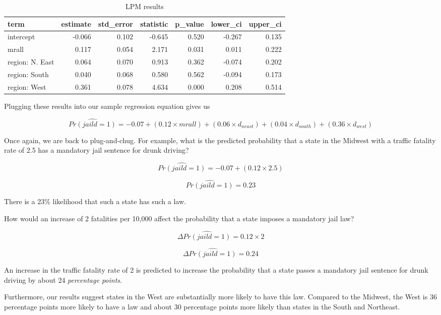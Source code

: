 \documentclass[
]{book}
\begin{document}
\begin{table}

\caption{\label{tab:lpmresults}LPM results}
\centering
\begin{tabular}[t]{l|r|r|r|r|r|r}
\hline
term & estimate & std\_error & statistic & p\_value & lower\_ci & upper\_ci\\
\hline
intercept & -0.066 & 0.102 & -0.645 & 0.520 & -0.267 & 0.135\\
\hline
mrall & 0.117 & 0.054 & 2.171 & 0.031 & 0.011 & 0.222\\
\hline
region: N. East & 0.064 & 0.070 & 0.913 & 0.362 & -0.074 & 0.202\\
\hline
region: South & 0.040 & 0.068 & 0.580 & 0.562 & -0.094 & 0.173\\
\hline
region: West & 0.361 & 0.078 & 4.634 & 0.000 & 0.208 & 0.514\\
\hline
\end{tabular}
\end{table}

Plugging these results into our sample regression equation gives us

\[\hat{Pr(jaild=1)}= -0.07 + (0.12 \times mrall) + (0.06 \times d_{neast}) + (0.04 \times d_{south}) + (0.36 \times d_{west})\]

Once again, we are back to plug-and-chug. For example, what is the predicted probability that a state in the Midwest with a traffic fatality rate of 2.5 has a mandatory jail sentence for drunk driving?

\[\hat{Pr(jaild=1)}= -0.07 + (0.12 \times 2.5)\]

\[\hat{Pr(jaild=1)}=0.23\]

There is a 23\% likelihood that such a state has such a law.

How would an increase of 2 fatalities per 10,000 affect the probability that a state imposes a mandatory jail law?

\[\Delta \hat{Pr(jaild=1)}=0.12 \times 2\]

\[\Delta \hat{Pr(jaild=1)}=0.24\]

An increase in the traffic fatality rate of 2 is predicted to increase the probability that a state passes a mandatory jail sentence for drunk driving by about 24 \emph{percentage points}.

Furthermore, our results suggest states in the West are substantially more likely to have this law. Compared to the Midwest, the West is 36 percentage points more likely to have a law and about 30 percentage points more likely than states in the South and Northeast.
\end{document}
